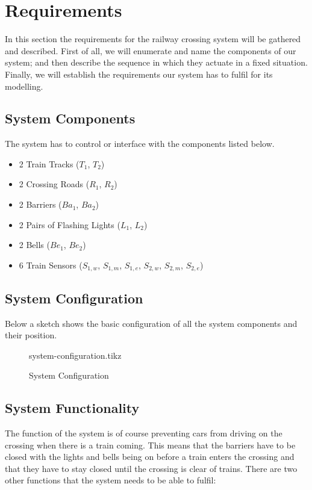 \documentclass[final]{report}
\begin{document}
\chapter{Requirements}
In this section the requirements for the railway crossing system will be gathered and described.
First of all, we will enumerate and name the components of our system; and then describe the sequence in which they actuate in a fixed situation.
Finally, we will establish the requirements our system has to fulfil for its modelling.

\section{System Components}
The system has to control or interface with the components listed below.
\begin{itemize}
\item 2 Train Tracks ($T_{1}$, $T_{2}$)
\item 2 Crossing Roads ($R_{1}$, $R_{2}$)
\item 2 Barriers ($Ba_{1}$, $Ba_{2}$)
\item 2 Pairs of Flashing Lights ($L_{1}$, $L_{2}$)
\item 2 Bells ($Be_{1}$, $Be_{2}$)
\item 6 Train Sensors ($S_{1,w}$, $S_{1,m}$, $S_{1,e}$, $S_{2,w}$, $S_{2,m}$, $S_{2,e}$)
\end{itemize}

\section{System Configuration}
Below a sketch shows the basic configuration of all the system components and their position.
\begin{figure}[H]
	\centering
	{system-configuration.tikz}
	\caption{System Configuration}
	\label{fig:system-configuration}
\end{figure}

\section{System Functionality}\label{sec:requirements}
The function of the system is of course preventing cars from driving on the crossing when there is a train coming.
This means that the barriers have to be closed with the lights and bells being on before a train enters the crossing and that they have to stay closed until the crossing is clear of trains.
There are two other functions that the system needs to be able to fulfil:
\end{document}
